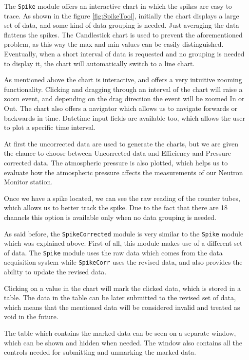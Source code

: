\documentclass[a4paper]{jpconf}
\begin{document}
The \texttt{Spike} module offers an interactive chart in which the spikes
are easy to trace. As shown in the figure \ref{fig:SpikeTool}, initially the
chart displays a large set of data, and some kind of data grouping is needed.
Just averaging the data flattens the spikes.  The Candlestick chart is used to
prevent the aforementioned problem, as this way the max and min values can be
easily distinguished. Eventually, when a short interval of data is requested and
no grouping is needed to display it, the chart will automatically switch to a
line chart.

As mentioned above the chart is interactive, and offers a very intuitive
zooming functionality. Clicking and dragging through an interval of the chart will
raise a zoom event, and depending on the drag direction the event will be zoomed In
or Out. The chart also offers a navigator which allows us to navigate forwards or
backwards in time. Datetime input fields are available too, which allows the user to
plot a specific time interval.

At first the uncorrected data are used to generate the charts, but we are given
the chance to choose between Uncorrected data and Efficiency and Pressure corrected
data. The atmospheric pressure is also plotted, which helps us to evaluate how the
atmospheric pressure affects the measurements of our Neutron Monitor station.

Once we have a spike located, we can see the raw reading of the counter tubes,
which allows us to better track the spike. Due to the fact that there are 18
channels this option is available only when no data grouping is needed.

As said before, the \texttt{SpikeCorrected} module is very similar to the
\texttt{Spike} module which was explained above. First of all, this module makes
use of a different set of data. The \texttt{Spike} module uses the raw data which
comes from the data acquisition system while \texttt{SpikeCorr} uses the
revised data, and also provides the ability to update the revised data.

Clicking on a value in the chart will mark the clicked data, which is
stored in a table. The data in the table can be later submitted to the revised
set of data, which means that the mentioned data will be considered invalid and
treated as void in the future.

The table which contains the marked data can be seen on a separate window, which
can be shown and hidden when needed. The window also contains all the
controls needed for submitting and unmarking the marked data.
\end{document}
